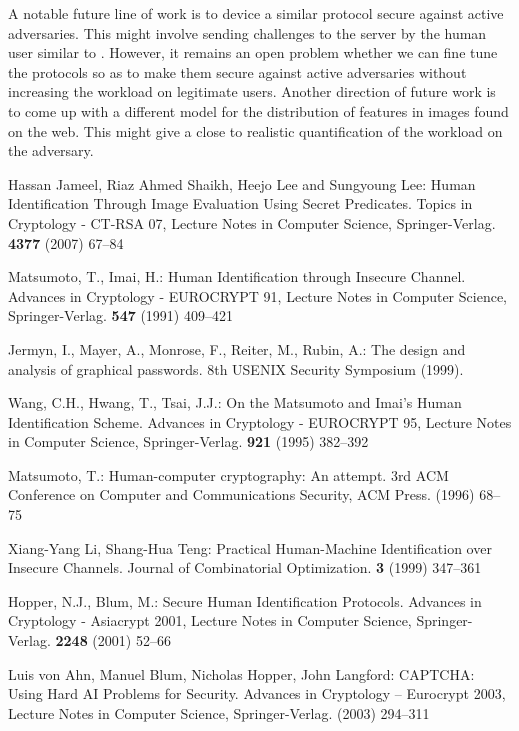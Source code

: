 \documentclass{llncs}
\begin{document}
A notable future line of work is to device a similar protocol secure against active adversaries. This might involve sending challenges to the server by the human user similar to \cite{pervasive}. However, it remains an open problem whether we can fine tune the protocols so as to make them secure against active adversaries without increasing the workload on legitimate users. Another direction of future work is to come up with a different model for the distribution of features in images found on the web. This might give a close to realistic quantification of the workload on the adversary.
\begin{thebibliography}{1}
Hassan Jameel, Riaz Ahmed Shaikh, Heejo Lee and Sungyoung Lee: 
Human Identification Through Image Evaluation Using Secret Predicates.
Topics in Cryptology - CT-RSA 07, Lecture Notes in Computer Science, 
Springer-Verlag. {\bf 4377} (2007) 67--84

Matsumoto, T., Imai, H.:
Human Identification through Insecure 
Channel.
Advances in Cryptology - EUROCRYPT 91, Lecture Notes in Computer 
Science, Springer-Verlag. {\bf 547} (1991) 409--421

Jermyn, I., Mayer, A., Monrose, F., Reiter, M., Rubin, A.:
The design and analysis of graphical passwords.
8th USENIX Security Symposium (1999).

Wang, C.H., Hwang, T., Tsai, J.J.:
On the Matsumoto and Imai's Human 
Identification Scheme.
Advances in Cryptology - EUROCRYPT 95, Lecture 
Notes in Computer Science, Springer-Verlag. {\bf 921} (1995) 382--392

Matsumoto, T.:
Human-computer cryptography: An attempt.
3rd ACM Conference on Computer and Communications Security, ACM Press. (1996) 68--75

Xiang-Yang Li, Shang-Hua Teng:
Practical Human-Machine Identification 
over Insecure Channels.
Journal of Combinatorial Optimization. {\bf 3} (1999) 347--361

Hopper, N.J., Blum, M.:
Secure Human Identification Protocols.
Advances in Cryptology - Asiacrypt 2001, Lecture Notes
 in Computer Science, Springer-Verlag. {\bf 2248} (2001) 52--66
 
Luis von Ahn, Manuel Blum, Nicholas Hopper, John Langford:
CAPTCHA: Using Hard AI Problems for Security.
Advances in Cryptology -- Eurocrypt 2003, Lecture Notes in Computer Science, Springer-Verlag. (2003) 294--311


\end{thebibliography}
\end{document}
